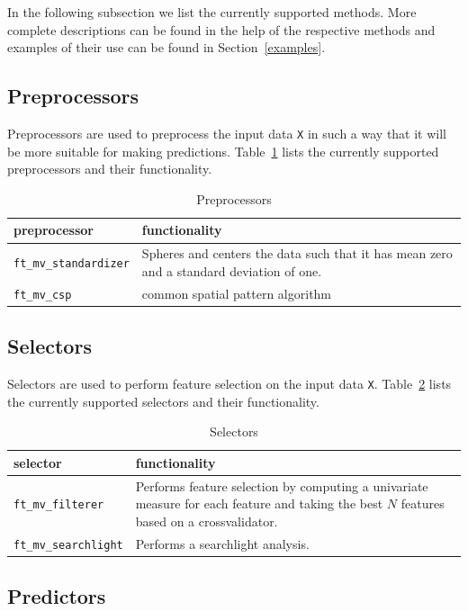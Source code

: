 \documentclass{article}
\renewcommand{\t}[1]{{\tt #1}}
\begin{document}
In the following subsection we list the currently supported methods. More complete descriptions can be found in the help of the respective methods and examples of their use can be found in Section~\ref{examples}.

\subsection{Preprocessors}

Preprocessors are used to preprocess the input data \t{X} in such a way that it will be more suitable for making predictions. Table~\ref{preprocessors} lists the currently supported preprocessors and their functionality.

\begin{table}[ht]
\centering
\caption{Preprocessors}
\begin{tabular}{p{}|p{}}
\bf{preprocessor} & \bf{functionality}\\
\hline
\t{ft\_mv\_standardizer} & Spheres and centers the data such that it has mean zero and a standard deviation of one.\\
\t{ft\_mv\_csp} & common spatial pattern algorithm
\end{tabular}
\label{preprocessors}
\end{table}

\subsection{Selectors}

Selectors are used to perform feature selection on the input data \t{X}. Table~\ref{selectors} lists the currently supported selectors and their functionality.

\begin{table}[ht]
\centering
\caption{Selectors}
\begin{tabular}{p{}|p{}}
\bf{selector} & \bf{functionality}\\
\hline
\t{ft\_mv\_filterer} & Performs feature selection by computing a univariate measure for each feature and taking the best $N$ features based on a crossvalidator.\\
\t{ft\_mv\_searchlight} & Performs a searchlight analysis.
\end{tabular}
\label{selectors}
\end{table}

\subsection{Predictors}
\end{document}
